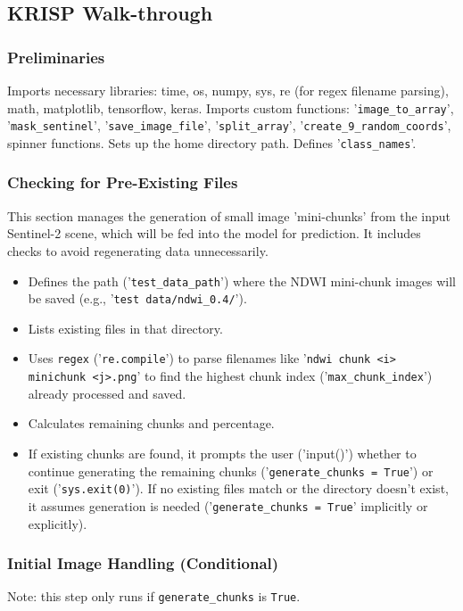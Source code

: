 \subsection{KRISP Walk-through}

\subsubsection{Preliminaries}
Imports necessary libraries: time, os, numpy, sys, re (for regex filename parsing), math, matplotlib, tensorflow, keras. Imports custom functions: '\verb|image_to_array|', '\verb|mask_sentinel|', '\verb|save_image_file|', '\verb|split_array|', '\verb|create_9_random_coords|', spinner functions. Sets up the home directory path. Defines '\verb|class_names|'.

\subsubsection{Checking for Pre-Existing Files}
This section manages the generation of small image 'mini-chunks' from the input Sentinel-2 scene, which will be fed into the model for prediction. It includes checks to avoid regenerating data unnecessarily.
\begin{itemize}
    \item Defines the path ('\verb|test_data_path|') where the NDWI mini-chunk images will be saved (e.g., '\verb|test data/ndwi_0.4/|').
    \item Lists existing files in that directory.
    \item Uses \verb|regex| ('\verb|re.compile|') to parse filenames like '\verb|ndwi chunk <i> minichunk <j>.png|' to find the highest chunk index ('\verb|max_chunk_index|') already processed and saved.
    \item Calculates remaining chunks and percentage.
    \item If existing chunks are found, it prompts the user ('input()') whether to continue generating the remaining chunks ('\verb|generate_chunks = True|') or exit ('\verb|sys.exit(0)|'). If no existing files match or the directory doesn't exist, it assumes generation is needed ('\verb|generate_chunks = True|' implicitly or explicitly).
\end{itemize}

\subsubsection{Initial Image Handling (Conditional)}
Note: this step only runs if \verb|generate_chunks| is \verb|True|.

